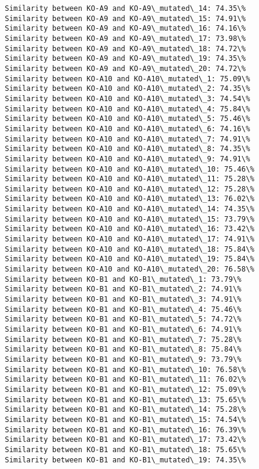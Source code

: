\documentclass[11pt]{article}
\begin{document}
\begin{Verbatim}[commandchars=\\\{\}]
Similarity between KO-A9 and KO-A9\_mutated\_14: 74.35\%
Similarity between KO-A9 and KO-A9\_mutated\_15: 74.91\%
Similarity between KO-A9 and KO-A9\_mutated\_16: 74.16\%
Similarity between KO-A9 and KO-A9\_mutated\_17: 73.98\%
Similarity between KO-A9 and KO-A9\_mutated\_18: 74.72\%
Similarity between KO-A9 and KO-A9\_mutated\_19: 74.35\%
Similarity between KO-A9 and KO-A9\_mutated\_20: 74.72\%
Similarity between KO-A10 and KO-A10\_mutated\_1: 75.09\%
Similarity between KO-A10 and KO-A10\_mutated\_2: 74.35\%
Similarity between KO-A10 and KO-A10\_mutated\_3: 74.54\%
Similarity between KO-A10 and KO-A10\_mutated\_4: 75.84\%
Similarity between KO-A10 and KO-A10\_mutated\_5: 75.46\%
Similarity between KO-A10 and KO-A10\_mutated\_6: 74.16\%
Similarity between KO-A10 and KO-A10\_mutated\_7: 74.91\%
Similarity between KO-A10 and KO-A10\_mutated\_8: 74.35\%
Similarity between KO-A10 and KO-A10\_mutated\_9: 74.91\%
Similarity between KO-A10 and KO-A10\_mutated\_10: 75.46\%
Similarity between KO-A10 and KO-A10\_mutated\_11: 75.28\%
Similarity between KO-A10 and KO-A10\_mutated\_12: 75.28\%
Similarity between KO-A10 and KO-A10\_mutated\_13: 76.02\%
Similarity between KO-A10 and KO-A10\_mutated\_14: 74.35\%
Similarity between KO-A10 and KO-A10\_mutated\_15: 73.79\%
Similarity between KO-A10 and KO-A10\_mutated\_16: 73.42\%
Similarity between KO-A10 and KO-A10\_mutated\_17: 74.91\%
Similarity between KO-A10 and KO-A10\_mutated\_18: 75.84\%
Similarity between KO-A10 and KO-A10\_mutated\_19: 75.84\%
Similarity between KO-A10 and KO-A10\_mutated\_20: 76.58\%
Similarity between KO-B1 and KO-B1\_mutated\_1: 73.79\%
Similarity between KO-B1 and KO-B1\_mutated\_2: 74.91\%
Similarity between KO-B1 and KO-B1\_mutated\_3: 74.91\%
Similarity between KO-B1 and KO-B1\_mutated\_4: 75.46\%
Similarity between KO-B1 and KO-B1\_mutated\_5: 74.72\%
Similarity between KO-B1 and KO-B1\_mutated\_6: 74.91\%
Similarity between KO-B1 and KO-B1\_mutated\_7: 75.28\%
Similarity between KO-B1 and KO-B1\_mutated\_8: 75.84\%
Similarity between KO-B1 and KO-B1\_mutated\_9: 73.79\%
Similarity between KO-B1 and KO-B1\_mutated\_10: 76.58\%
Similarity between KO-B1 and KO-B1\_mutated\_11: 76.02\%
Similarity between KO-B1 and KO-B1\_mutated\_12: 75.09\%
Similarity between KO-B1 and KO-B1\_mutated\_13: 75.65\%
Similarity between KO-B1 and KO-B1\_mutated\_14: 75.28\%
Similarity between KO-B1 and KO-B1\_mutated\_15: 74.54\%
Similarity between KO-B1 and KO-B1\_mutated\_16: 76.39\%
Similarity between KO-B1 and KO-B1\_mutated\_17: 73.42\%
Similarity between KO-B1 and KO-B1\_mutated\_18: 75.65\%
Similarity between KO-B1 and KO-B1\_mutated\_19: 74.35\%

\end{Verbatim}
\end{document}
